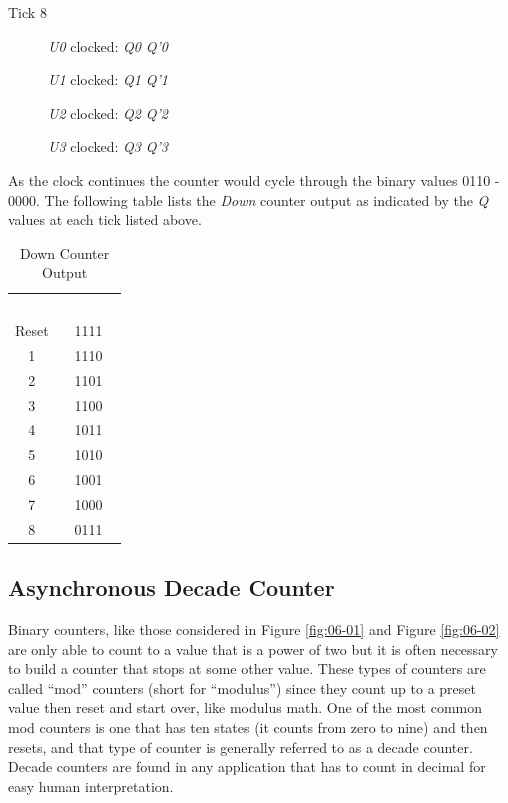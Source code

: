 \begin{description}
	\item [Tick 8] \textit{U0} clocked: \textit{Q0} \textuparrow \: \textemdash \: \textit{Q'0} \textdownarrow
	
	\hspace{14pt}\textit{U1} clocked: \textit{Q1} \textuparrow \: \textemdash \: \textit{Q'1} \textdownarrow
	
	\hspace{14pt}\textit{U2} clocked: \textit{Q2} \textuparrow \: \textemdash \: \textit{Q'2} \textdownarrow
	
	\hspace{14pt}\textit{U3} clocked: \textit{Q3} \textdownarrow \: \textemdash \: \textit{Q'3} \textuparrow
	
\end{description}

As the clock continues the counter would cycle through the binary values 0110 - 0000. The following table lists the \textit{Down} counter output as indicated by the \textit{Q} values at each tick listed above.

\begin{table}[H]
	\sffamily
	\newcommand{\head}[1]{\textcolor{white}{\textbf{#1}}}		
	\begin{center}
		\begin{tabular}{cc} 
			\rowcolor{black!75}
			\head{Tick} & \head{Output} \\
			Reset & 1111 \\
			1 & 1110 \\
			2 & 1101 \\
			3 & 1100 \\
			4 & 1011 \\
			5 & 1010 \\
			6 & 1001 \\
			7 & 1000 \\
			8 & 0111
		\end{tabular}
	\end{center}
	\caption{Down Counter Output}
	\label{tab0602}
\end{table}


\subsection{Asynchronous Decade Counter}

Binary counters, like those considered in Figure \ref{fig:06-01} and Figure \ref{fig:06-02} are only able to count to a value that is a power of two but it is often necessary to build a counter that stops at some other value. These types of counters are called ``mod'' counters (short for ``modulus'') since they count up to a preset value then reset and start over, like modulus math. One of the most common mod counters is one that has ten states (it counts from zero to nine) and then resets, and that type of counter is generally referred to as a decade counter. Decade counters are found in any application that has to count in decimal for easy human interpretation.

